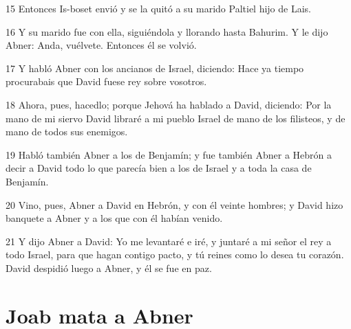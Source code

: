 \par 15 Entonces Is-boset envió y se la quitó a su marido Paltiel hijo de Lais.
\par 16 Y su marido fue con ella, siguiéndola y llorando hasta Bahurim. Y le dijo Abner: Anda, vuélvete. Entonces él se volvió.
\par 17 Y habló Abner con los ancianos de Israel, diciendo: Hace ya tiempo procurabais que David fuese rey sobre vosotros.
\par 18 Ahora, pues, hacedlo; porque Jehová ha hablado a David, diciendo: Por la mano de mi siervo David libraré a mi pueblo Israel de mano de los filisteos, y de mano de todos sus enemigos. 
\par 19 Habló también Abner a los de Benjamín; y fue también Abner a Hebrón a decir a David todo lo que parecía bien a los de Israel y a toda la casa de Benjamín.
\par 20 Vino, pues, Abner a David en Hebrón, y con él veinte hombres; y David hizo banquete a Abner y a los que con él habían venido.
\par 21 Y dijo Abner a David: Yo me levantaré e iré, y juntaré a mi señor el rey a todo Israel, para que hagan contigo pacto, y tú reines como lo desea tu corazón. David despidió luego a Abner, y él se fue en paz.

\section*{Joab mata a Abner}

